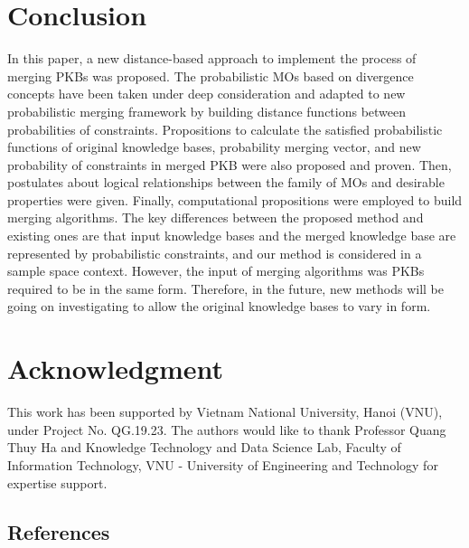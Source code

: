 \documentclass[]{iosart2c}
\begin{document}
\section{Conclusion}

In this paper, a new distance-based approach to implement the process of merging PKBs was proposed. The probabilistic MOs based on divergence concepts have been taken under deep consideration and adapted to new probabilistic merging framework by building distance functions between probabilities of constraints. Propositions to calculate the satisfied probabilistic functions of original knowledge bases, probability merging vector, and new probability of constraints in merged PKB were also proposed and proven. Then, postulates about logical relationships between the family of MOs and desirable properties were given. Finally, computational propositions were employed to build merging algorithms. The key differences between the proposed method and existing ones are that input knowledge bases and the merged knowledge base are represented by probabilistic constraints, and our method is considered in a sample space context. However, the input of merging algorithms was PKBs required to be in the same form. Therefore, in the future, new methods will be going on investigating to allow the original knowledge bases to vary in form. 

\section{Acknowledgment}

This work has been supported by Vietnam National University, Hanoi (VNU), under Project No. QG.19.23. The authors would like to thank Professor Quang Thuy Ha and Knowledge Technology and Data Science Lab, Faculty of Information Technology, VNU - University of Engineering and Technology for expertise support.

\subsection{References}


\end{document}
